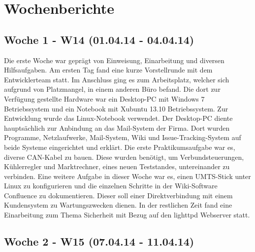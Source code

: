 \documentclass{article}
\begin{document}
\clearpage

\section{Wochenberichte}

\subsection{Woche 1 - W14 (01.04.14 - 04.04.14)}

Die erste Woche war geprägt von Einweisung, Einarbeitung und diversen Hilfsaufgaben. Am ersten Tag fand eine kurze Vorstellrunde mit dem Entwicklerteam statt. Im Anschluss ging es zum Arbeitsplatz, welcher sich aufgrund von Platzmangel, in einem anderen Büro befand. Die dort zur Verfügung gestellte Hardware war ein Desktop-PC mit Windows 7 Betriebssystem und ein Notebook mit Xubuntu 13.10 Betriebssystem. Zur Entwicklung wurde das Linux-Notebook verwendet. Der Desktop-PC diente hauptsächlich zur Anbindung an das Mail-System der Firma. Dort wurden Programme, Netzlaufwerke, Mail-System, Wiki und Issue-Tracking-System auf beide Systeme eingerichtet und erklärt. Die erste Praktikumsaufgabe war es, diverse CAN-Kabel zu bauen. Diese wurden benötigt, um Verbundsteuerungen, Kühlerregler und Marktrechner, eines neuen Teststandes, untereinander zu verbinden. Eine weitere Aufgabe in dieser Woche war es, einen UMTS-Stick unter Linux zu konfigurieren und die einzelnen Schritte in der Wiki-Software Confluence zu dokumentieren. Dieser soll einer Direktverbindung mit einem Kundensystem zu Wartungszwecken dienen. In der restlichen Zeit fand eine Einarbeitung zum Thema Sicherheit mit Bezug auf den lighttpd Webserver statt.

\subsection{Woche 2 - W15 (07.04.14 - 11.04.14)}
\end{document}
